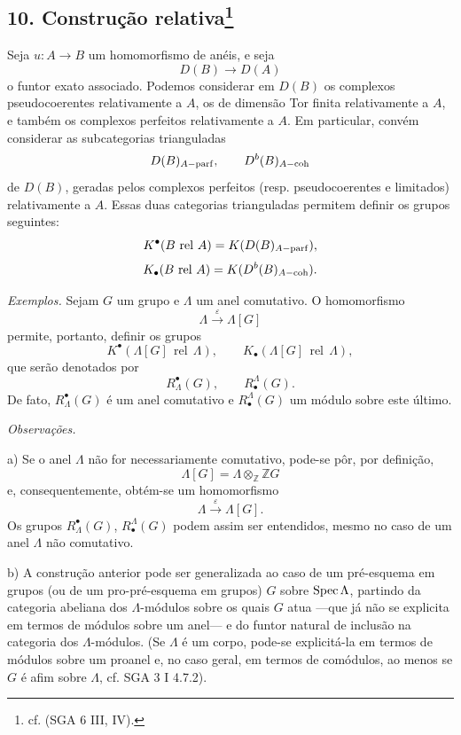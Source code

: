 \subsection*{10. Construção relativa\footnote{cf. (SGA 6 III, IV).}}

Seja $u:A\to B$ um homomorfismo de anéis, e seja
\[
D(B)\longrightarrow D(A)
\]
o funtor exato associado. Podemos considerar em $D(B)$ os complexos pseudocoerentes relativamente a $A$, os de dimensão Tor finita relativamente a $A$, e também os complexos perfeitos relativamente a $A$. Em particular, convém considerar as subcategorias trianguladas
\[
D(B)_{A-\mathrm{parf}},\qquad D^b(B)_{A-\mathrm{coh}}
\]
de $D(B)$, geradas pelos complexos perfeitos (resp. pseudocoerentes e limitados) relativamente a $A$. Essas duas categorias trianguladas permitem definir os grupos seguintes:
\[
K^{\bullet}(B\operatorname{\,rel\,}A)=K(D(B)_{A-\mathrm{parf}}),
\]
\[
K_\bullet(B\operatorname{\,rel\,}A)=K(D^b(B)_{A-\mathrm{coh}}).
\]

\emph{Exemplos.} Sejam $G$ um grupo e $\Lambda$ um anel comutativo. O homomorfismo
\[
\Lambda\xrightarrow{\varepsilon}\Lambda[G]
\]
permite, portanto, definir os grupos
\[
K^{\bullet}(\Lambda[G]\operatorname{\,rel\,}\Lambda),\qquad
K_\bullet(\Lambda[G]\operatorname{\,rel\,}\Lambda),
\]
que serão denotados por
\[
R^{\bullet}_\Lambda(G),\qquad R^\Lambda_\bullet(G).
\]
De fato, $R^{\bullet}_\Lambda(G)$ é um anel comutativo e $R^\Lambda_\bullet(G)$ um módulo sobre este último.

\emph{Observações.}

a) Se o anel $\Lambda$ não for necessariamente comutativo, pode-se pôr, por definição,
\[
\Lambda[G]=\Lambda\otimes_{\mathbb Z}\mathbb ZG
\]
e, consequentemente, obtém-se um homomorfismo
\[
\Lambda\xrightarrow{\varepsilon}\Lambda[G].
\]
Os grupos $R^{\bullet}_\Lambda(G)$, $R^\Lambda_\bullet(G)$ podem assim ser entendidos, mesmo no caso de um anel $\Lambda$ não comutativo.

b) A construção anterior pode ser generalizada ao caso de um pré-esquema em grupos (ou de um pro-pré-esquema em grupos) $G$ sobre $\operatorname{Spec}\Lambda$, partindo da categoria abeliana dos $\Lambda$-módulos sobre os quais $G$ atua ---que já não se explicita em termos de módulos sobre um anel--- e do funtor natural de inclusão na categoria dos $\Lambda$-módulos. (Se $\Lambda$ é um corpo, pode-se explicitá-la em termos de módulos sobre um proanel e, no caso geral, em termos de comódulos, ao menos se $G$ é afim sobre $\Lambda$, cf. SGA 3 I 4.7.2).
